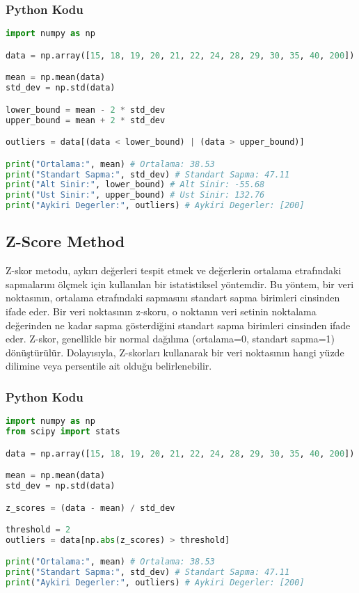 \subsubsection{Python Kodu}

\begin{lstlisting}[language=Python]
import numpy as np

data = np.array([15, 18, 19, 20, 21, 22, 24, 28, 29, 30, 35, 40, 200])

mean = np.mean(data)
std_dev = np.std(data)

lower_bound = mean - 2 * std_dev
upper_bound = mean + 2 * std_dev

outliers = data[(data < lower_bound) | (data > upper_bound)]

print("Ortalama:", mean) # Ortalama: 38.53
print("Standart Sapma:", std_dev) # Standart Sapma: 47.11
print("Alt Sinir:", lower_bound) # Alt Sinir: -55.68
print("Ust Sinir:", upper_bound) # Ust Sinir: 132.76
print("Aykiri Degerler:", outliers) # Aykiri Degerler: [200]
\end{lstlisting}

\newpage

\subsection{Z-Score Method}
Z-skor metodu, aykırı değerleri tespit etmek ve değerlerin ortalama etrafındaki sapmalarını ölçmek için kullanılan bir istatistiksel yöntemdir. Bu yöntem, bir veri noktasının, ortalama etrafındaki sapmasını standart sapma birimleri cinsinden ifade eder. Bir veri noktasının z-skoru, o noktanın veri setinin noktalama değerinden ne kadar sapma gösterdiğini standart sapma birimleri cinsinden ifade eder. Z-skor, genellikle bir normal dağılıma (ortalama=0, standart sapma=1) dönüştürülür. Dolayısıyla, Z-skorları kullanarak bir veri noktasının hangi yüzde dilimine veya persentile ait olduğu belirlenebilir.

\subsubsection{Python Kodu}

\begin{lstlisting}[language=Python]
import numpy as np
from scipy import stats

data = np.array([15, 18, 19, 20, 21, 22, 24, 28, 29, 30, 35, 40, 200])

mean = np.mean(data)
std_dev = np.std(data)

z_scores = (data - mean) / std_dev

threshold = 2
outliers = data[np.abs(z_scores) > threshold]

print("Ortalama:", mean) # Ortalama: 38.53
print("Standart Sapma:", std_dev) # Standart Sapma: 47.11
print("Aykiri Degerler:", outliers) # Aykiri Degerler: [200]
\end{lstlisting}

